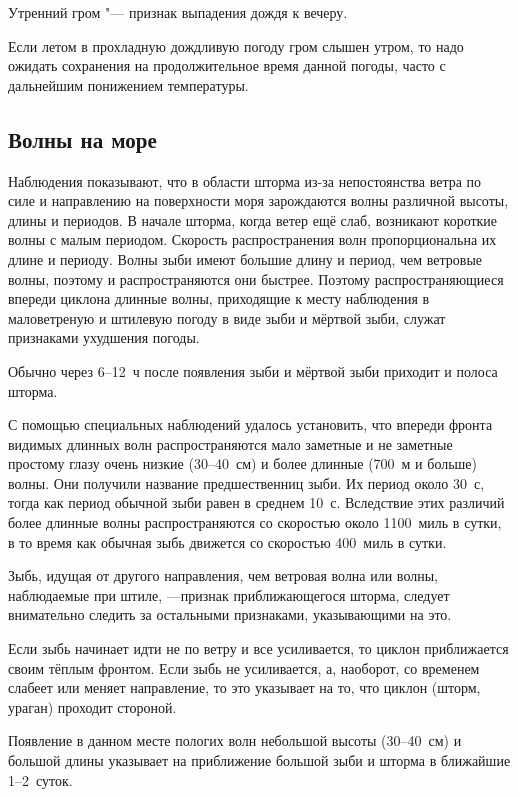  Утренний гром "--- признак выпадения дождя к вечеру.

 Если летом в прохладную дождливую погоду гром слышен утром, то
надо ожидать сохранения на продолжительное время данной погоды, часто
с дальнейшим понижением температуры.

\subsection{Волны на море}\label{sec:waves_on_sea}

Наблюдения показывают, что в области шторма из-за непостоянства ветра
по силе и направлению на поверхности моря зарождаются волны различной
высоты, длины и периодов. В начале шторма, когда ветер ещё слаб,
возникают короткие волны с малым периодом. Скорость распространения
волн пропорциональна их длине и периоду. Волны зыби имеют большие
длину и период, чем ветровые волны, поэтому и распространяются они
быстрее. Поэтому распространяющиеся впереди циклона длинные волны,
приходящие к месту наблюдения в маловетреную и штилевую погоду в виде
зыби и мёртвой зыби, служат признаками ухудшения погоды.

Обычно через 6--12~ч после появления зыби и мёртвой зыби приходит и
полоса шторма.

С помощью специальных наблюдений удалось установить, что впереди
фронта видимых длинных волн распространяются мало заметные и не
заметные простому глазу очень низкие (30--40~см) и более длинные (700~м
и больше) волны. Они получили название предшественниц зыби. Их период
около 30~с, тогда как период обычной зыби равен в среднем 10~с.
Вследствие этих различий более длинные волны распространяются со
скоростью около 1100~миль в сутки, в то время как обычная зыбь
движется со скоростью 400~миль в сутки.

 Зыбь, идущая от другого направления, чем ветровая волна или
волны, наблюдаемые при штиле, —признак приближающегося шторма, следует
внимательно следить за остальными признаками, указывающими на это.

 Если зыбь начинает идти не по ветру и все усиливается, то
циклон приближается своим тёплым фронтом. Если зыбь не усиливается, а,
наоборот, со временем слабеет или меняет направление, то это указывает
на то, что циклон (шторм, ураган) проходит стороной.

 Появление в данном месте пологих волн небольшой высоты (30--40~см)
и большой длины указывает на приближение большой зыби и шторма в
ближайшие 1--2~суток.

